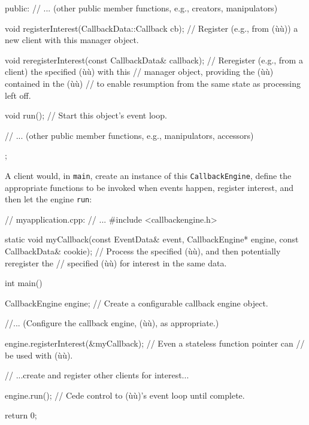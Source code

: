 \begin{emcppslisting}[emcppsbatch=e6]
{public:
    // ...   (other public member functions, e.g., creators, manipulators)

    void registerInterest(CallbackData::Callback cb);
        // Register (e.g., from (ù{}ù)) a new client with this manager object.

    void reregisterInterest(const CallbackData& callback);
        // Reregister (e.g., from a client) the specified (ù{}ù) with this
        // manager object, providing the (ù{}ù) contained in the (ù{}ù)
        // to enable resumption from the same state as processing left off.

    void run();
        // Start this object's event loop.

    // ...  (other public member functions, e.g., manipulators, accessors)
};
\end{emcppslisting}

\noindent A client would, in \lstinline!main!, create an instance of this
\lstinline!CallbackEngine!, define the appropriate functions to be invoked
when events happen, register interest, and then let the engine
\lstinline!run!:

\begin{emcppslisting}[emcppsbatch=e6]
// myapplication.cpp:
// ...
#include <callbackengine.h>

static void myCallback(const EventData&    event,
                       CallbackEngine*     engine,
                       const CallbackData& cookie);
    // Process the specified (ù{}ù), and then potentially reregister the
    // specified (ù{}ù) for interest in the same data.

int main()
{
   CallbackEngine engine;  // Create a configurable callback engine object.

   //...     (Configure the callback engine, (ù{}ù), as appropriate.)

   engine.registerInterest(&myCallback);  // Even a stateless function pointer can
                                          // be used with (ù{}ù).

   // ...create and register other clients for interest...

   engine.run();    // Cede control to (ù{}ù)'s event loop until complete.

   return 0;
}
\end{emcppslisting}


